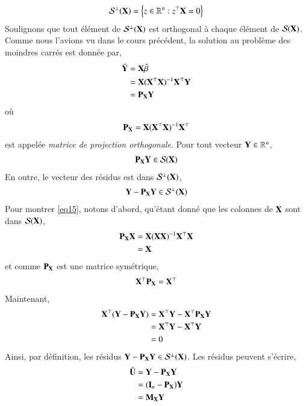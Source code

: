 \begin{align*}
\mathcal{S}^\perp(\mathbf X) = \left\{z \in \mathbb{R}^n: z^\top\mathbf X=0\right\}
\end{align*}
Soulignons que tout élément de $\mathcal{S}^\perp(\mathbf X)$ est orthogonal à chaque élément de $\mathcal{S}(\mathbf X)$.\\
Comme nous l'avions vu dans le cours précédent, la solution au problème des moindres carrés est donnée par,
\begin{align*}
\hat{\mathbf Y} &= \mathbf X\hat{\beta}\\
&=\mathbf X(\mathbf X^\top\mathbf X)^{-1}\mathbf X^\top\mathbf Y\\
&=\mathbf P_{\mathbf X}\mathbf Y
\end{align*}
où 
\begin{align*} \mathbf P_{\mathbf X} = \mathbf X(\mathbf X^\top\mathbf X)^{-1}\mathbf X^\top
\end{align*}
est appelée \emph{matrice de projection orthogonale}. Pour tout vecteur $\mathbf Y\in\mathbb{R}^n$,
\begin{align*}
\mathbf P_{\mathbf X}\mathbf Y \in \mathcal{S}(\mathbf X)
\end{align*}
En outre, le vecteur des résidus est dans  $\mathcal{S}^\perp(\mathbf X)$,
\begin{align}
\mathbf Y - \mathbf P_{\mathbf X}\mathbf Y \in \mathcal{S}^\perp(\mathbf X)
\label{eq12}
\end{align}
Pour montrer \eqref{eq15}, notons d'abord, qu'étant donné que les colonnes de $\mathbf X$ sont dans $\mathcal{S}(\mathbf X)$,
\begin{align*}
\mathbf P_\mathbf X\mathbf X &= \mathbf X(\mathbf X\mathbf X)^{-1}\mathbf X^\top\mathbf X\\
&=\mathbf X
\end{align*}
et comme $\mathbf P_\mathbf X$ est une matrice symétrique,
\begin{align*}
\mathbf X^\top\mathbf P_\mathbf X = \mathbf X^\top
\end{align*}
Maintenant,
\begin{align*}
\mathbf X^\top(\mathbf Y - \mathbf P_\mathbf X\mathbf Y) &= \mathbf X^\top\mathbf Y-\mathbf X^\top\mathbf P_\mathbf X\mathbf Y\\
& = \mathbf X^\top\mathbf Y-\mathbf X^\top\mathbf Y\\
&=0 
\end{align*}
Ainsi, par définition, les résidus $\mathbf Y - \mathbf P_\mathbf X\mathbf Y\in\mathcal{S}^\perp(\mathbf X)$. Les résidus peuvent s'écrire,
\begin{align*}
\hat{\mathbf U} &= \mathbf Y-\mathbf P_\mathbf X\mathbf Y \\
&= (\mathbf{I}_n - \mathbf P_\mathbf X)\mathbf Y\\
& = \mathbf M_\mathbf X\mathbf Y
\end{align*}
